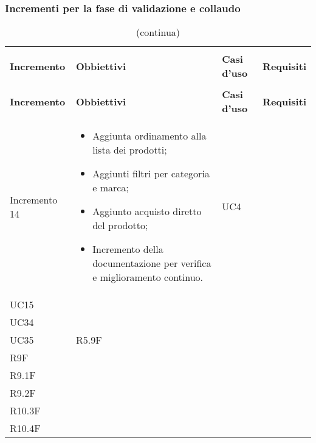 \subsubsection{Incrementi per la fase di validazione e collaudo}
\renewcommand{\arraystretch}{1.5}
\begin{longtable}{
    >{\centering}p{}
    >{\raggedright}p{}
    >{\centering}p{}
    >{\centering}p{}
    }

    \caption{Tabella di tracciamento per la validazione}                                                                           \\
    \rowcolor{white}                                                                                                               \\
    \rowcolor{logo!70}
    \centering\textbf{Incremento} & \centering\textbf{Obbiettivi}  & \centering\textbf{Casi d'uso}  & \centering\textbf{Requisiti}
    \tabularnewline
    \endfirsthead
    \rowcolor{white}\caption[]{(continua)}                                                                                         \\
    \rowcolor{logo!70}
    \centering\textbf{Incremento} & \centering\textbf{Obbiettivi}  & \centering\textbf{Casi d'uso}  & \centering\textbf{Requisiti}
    \tabularnewline
    \endhead
    Incremento 14                 & \vspace{-15px}
    \begin{itemize}
        \renewcommand\labelitemi{-}
        \item Aggiunta ordinamento alla lista dei prodotti;
        \item Aggiunti filtri per categoria e marca;
        \item Aggiunto acquisto diretto del prodotto;
        \item Incremento della documentazione per verifica e miglioramento continuo.
    \end{itemize}    & UC4                                                                                            \\ UC15 \\ UC34 \\ UC35  & R5.9F \\ R9F \\ R9.1F \\ R9.2F \\ R10.3F \\ R10.4F

\end{longtable}
